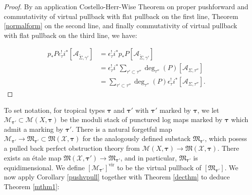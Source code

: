 \documentclass[12pt, oneside]{amsart}   	%
\newcounter{thm}
\newcommand{\vir}{\operatorname{vir}}
\numberwithin{equation}{section}
\numberwithin{thm}{section}
\numberwithin{figure}{section}
\begin{document}
\begin{proof}

By an application Costello-Herr-Wise Theorem \cite{pusherr} on proper pushforward and commutativity of virtual pullback with flat pullback on the first line, Theorem \ref{normalform} on the second line, and finally commutativity of virtual pullback with flat pullback on the third line, we have:

\begin{equation}
\begin{split}
 p_*P\epsilon_{\tau}^!i^*[\mathcal{A}_{\widetilde{\Sigma},\gamma'}] &=\epsilon^!_{\tau}i^*p_*P[\mathcal{A}_{\widetilde{\Sigma},\gamma'}]\\
&=\epsilon^!_{\tau}i^*\sum_{\tau' \subset\tau''} \deg_{\tau''}(P)[\mathcal{A}_{\Sigma,\tau''}]\\
&= \sum_{\tau'\subset \tau''}\deg_{\tau''}(P)\epsilon_{\tau}^!i^*[\mathcal{A}_{\Sigma,\tau''}].
\end{split}
\end{equation}
\end{proof}


To set notation, for tropical types $\pmb\tau$ and $\pmb\tau'$ with $\pmb\tau'$ marked by $\pmb\tau$, we let $\mathscr{M}_{\pmb\tau'} \subset \mathscr{M}(X,\pmb\tau)$ be the moduli stack of punctured log maps marked by $\pmb\tau$ which admit a marking by $\pmb\tau'$. There is a natural forgetful map $\mathscr{M}_{\pmb\tau'} \rightarrow \mathfrak{M}_{\pmb\tau'} \subset \mathfrak{M}(\mathcal{X},\pmb\tau)$ for the analogously defined substack $\mathfrak{M}_{\pmb\tau'}$, which posess a pulled back perfect obstruction theory from $\mathscr{M}(X,\pmb\tau) \rightarrow \mathfrak{M}(\mathcal{X},\pmb\tau)$. There exists an \'etale map $\mathfrak{M}(\mathcal{X},\pmb\tau') \rightarrow \mathfrak{M}_{\pmb\tau'}$, and in particular, $\mathfrak{M}_{\pmb\tau'}$ is equidimensional. We define $[\mathscr{M}_{\pmb\tau'}]^{\vir}$ to be the virtual pullback of $[\mathfrak{M}_{\pmb\tau'}]$.
We now apply Corollary \ref{pushvpull} together with Theorem \ref{decthm} to deduce Theorem \ref{mthm1}:
\end{document}
